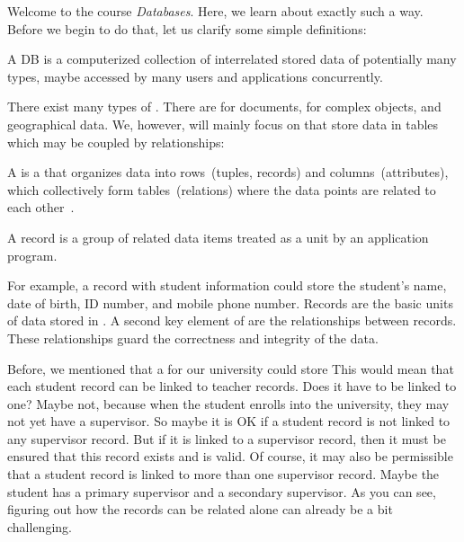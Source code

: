 Welcome to the course \emph{Databases}.
Here, we learn about exactly such a way.
Before we begin to do that, let us clarify some simple definitions:%
%
\begin{definition}[Database]%
A \acrfull{DB} is a computerized collection of interrelated stored data of potentially many types, maybe accessed by many users and applications concurrently.%
\end{definition}%
%
There exist many types of .
There are  for documents,  for complex objects, and  geographical data.
We, however, will mainly focus on  that store data in tables which may be coupled by relationships:%
%
\begin{definition}%
A  is a  that organizes data into rows~(tuples, records) and columns~(attributes), which collectively form tables~(relations) where the data points are related to each other~\cite{I2021WIARDB,C1970ARMODFLSDB,SC1975OTPOARADI,T2018ISARD,H2016RDDAI,HM2024IMARD}.
\end{definition}%
%
\begin{definition}[Record]%
A record is a group of related data items treated as a unit by an application program.%
\end{definition}%
%
For example, a record with student information could store the student's name, date of birth, ID number, and mobile phone number.
Records are the basic units of data stored in .
A second key element of  are the relationships between records.
These relationships guard the correctness and integrity of the data.

Before, we mentioned that a  for our university could store 
This would mean that each student record can be linked to teacher records.
Does it have to be linked to one?
Maybe not, because when the student enrolls into the university, they may not yet have a supervisor.
So maybe it is OK if a student record is not linked to any supervisor record.
But if it is linked to a supervisor record, then it must be ensured that this record exists and is valid.
Of course, it may also be permissible that a student record is linked to more than one supervisor record.
Maybe the student has a primary supervisor and a secondary supervisor.
As you can see, figuring out how the records can be related alone can already be a bit challenging.%

